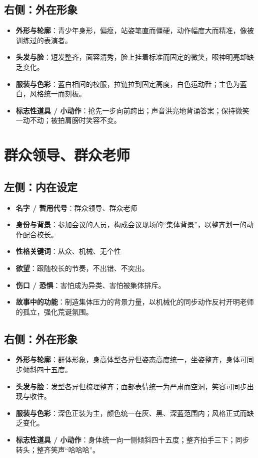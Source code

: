 \documentclass[11pt, a4paper]{article}
\begin{document}
	\subsection*{右侧：外在形象}
	
	\begin{itemize}[leftmargin=2em, itemsep=0.2em]
		\item \textbf{外形与轮廓}：青少年身形，偏瘦，站姿笔直而僵硬，动作幅度大而精准，像被训练过的表演者。
		\item \textbf{头发与脸}：短发整齐，面容清秀，脸上挂着标准而固定的微笑，眼神明亮却缺乏变化。
		\item \textbf{服装与色彩}：蓝白相间的校服，拉链拉到固定高度，白色运动鞋；主色为蓝白，风格统一而刻板。
		\item \textbf{标志性道具 / 小动作}：抢先一步向前跨出；声音洪亮地背诵答案；保持微笑一动不动；被拍肩膀时笑容不变。
	\end{itemize}
	
	\newpage
	
	\section{群众领导、群众老师}
	
	\subsection*{左侧：内在设定}
	
	\begin{itemize}[leftmargin=2em, itemsep=0.2em]
		\item \textbf{名字 / 暂用代号}：群众领导、群众老师
		\item \textbf{身份与背景}：参加会议的人员，构成会议现场的“集体背景”，以整齐划一的动作配合校长。
		\item \textbf{性格关键词}：从众、机械、无个性
		\item \textbf{欲望}：跟随校长的节奏，不出错、不突出。
		\item \textbf{伤口 / 恐惧}：害怕成为异类、害怕被集体排斥。
		\item \textbf{故事中的功能}：制造集体压力的背景力量，以机械化的同步动作反衬开明老师的孤立，强化荒诞氛围。
	\end{itemize}
	
	\subsection*{右侧：外在形象}
	
	\begin{itemize}[leftmargin=2em, itemsep=0.2em]
		\item \textbf{外形与轮廓}：群体形象，身高体型各异但姿态高度统一，坐姿整齐，身体可同步倾斜四十五度。
		\item \textbf{头发与脸}：发型各异但梳理整齐；面部表情统一为严肃而空洞，笑容可同步出现与收住。
		\item \textbf{服装与色彩}：深色正装为主，颜色统一在灰、黑、深蓝范围内；风格正式而缺乏变化。
		\item \textbf{标志性道具 / 小动作}：身体统一向一侧倾斜四十五度；整齐拍手三下；同步转头；整齐笑声“哈哈哈”。
	\end{itemize}
	
\end{document}
